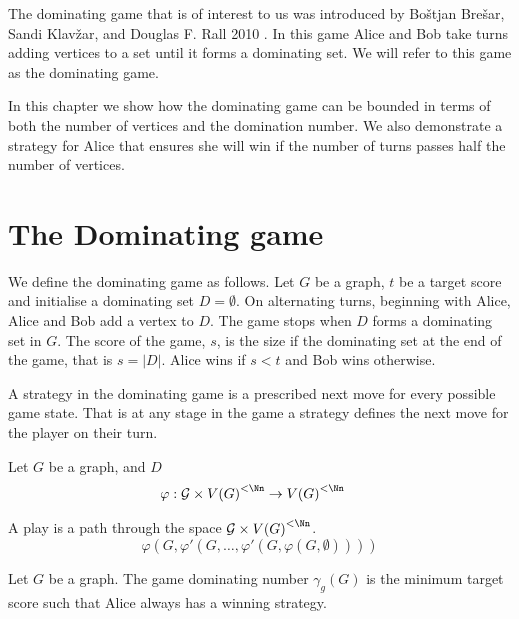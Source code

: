 The dominating game that is of interest to us was introduced by Bo\v{s}tjan Bre\v{s}ar, Sandi Klav\v{z}ar, and Douglas F. Rall 2010 \cite{BrKlRa2010}. In this game Alice and Bob take turns adding vertices to a set until it forms a dominating set. We will refer to this game as the dominating game.

In this chapter we show how the dominating game can be bounded in terms of both the number of vertices and the domination number. We also demonstrate a strategy for Alice that ensures she will win if the number of turns passes half the number of vertices.


\section{The Dominating game}

We define the dominating game as follows. Let $G$ be a graph, $t$ be a target score and initialise a dominating set $D=\emptyset$. On alternating turns, beginning with Alice, Alice and Bob add a vertex to $D$. The game stops when $D$ forms a dominating set in $G$. The score of the game, $s$, is the size if the dominating set at the end of the game, that is $s=|D|$. Alice wins if $s<t$ and Bob wins otherwise. %

A strategy in the dominating game is a prescribed next move for every possible game state. That is at any stage in the game a strategy defines the next move for the player on their turn. 

\begin{definition}
    Let $G$ be a graph, and $D$
    \begin{align}        
        \varphi &: \GG \times {V(G)}^{<\Nn} \to {V(G)}^{<\Nn} 
    \end{align}
\end{definition}

A play is a path through the space $\GG\times{V(G)}^{<\Nn}$. 
\[\varphi(G,\varphi'(G,\dots, \varphi'(G,\varphi(G,\emptyset))))\]
\begin{definition}
    Let $G$ be a graph. The game dominating number $\gamma_g(G)$ is the minimum target score such that Alice always has a winning strategy.
\end{definition} 

